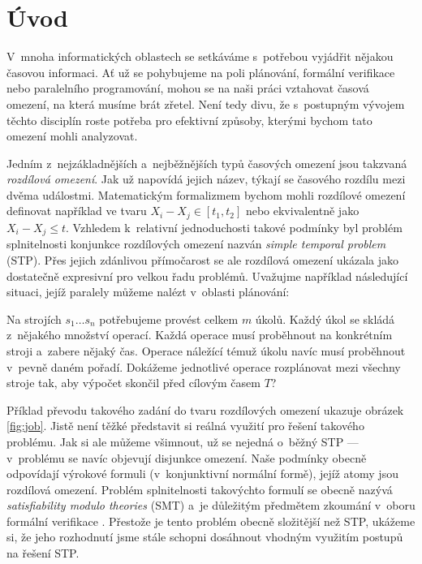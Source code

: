 \chapter*{Úvod}

V~mnoha informatických oblastech se setkáváme s~potřebou vyjádřit nějakou časovou informaci. Ať už se pohybujeme na poli plánování, formální verifikace nebo paralelního programování, mohou se na naši práci vztahovat časová omezení, na která musíme brát zřetel. Není tedy divu, že s~postupným vývojem těchto disciplín roste potřeba pro efektivní způsoby, kterými bychom tato omezení mohli analyzovat.

Jedním z~nejzákladnějších a~nejběžnějších typů časových omezení jsou takzvaná \emph{rozdílová omezení}. Jak už napovídá jejich název, týkají se časového rozdílu mezi dvěma událostmi. Matematickým formalizmem bychom mohli rozdílové omezení definovat například ve tvaru $X_i - X_j \in [t_1, t_2]$ nebo ekvivalentně jako $X_i - X_j \leq t$. Vzhledem k~relativní jednoduchosti takové podmínky byl problém splnitelnosti konjunkce rozdílových omezení nazván \emph{simple temporal problem} (STP). Přes jejich zdánlivou přímočarost se ale rozdílová omezení ukázala jako dostatečně expresivní pro velkou řadu problémů. Uvažujme například následující situaci, jejíž paralely můžeme nalézt v~oblasti plánování: 

\begin{center}
\begin{minipage}{\textwidth}
Na strojích $s_1 \dots s_n$ potřebujeme provést celkem $m$ úkolů. Každý úkol se skládá z~nějakého množství operací. Každá operace musí proběhnout na konkrétním stroji a~zabere nějaký čas. Operace náležící témuž úkolu navíc musí proběhnout v~pevně daném pořadí. Dokážeme jednotlivé operace rozplánovat mezi všechny stroje tak, aby výpočet skončil před cílovým časem $T$?
\end{minipage}
\end{center}

Příklad převodu takového zadání do tvaru rozdílových omezení ukazuje obrázek \ref{fig:job}. Jistě není těžké představit si reálná využití pro řešení takového problému. Jak si ale můžeme všimnout, už se nejedná o~běžný STP --- v~problému se navíc objevují disjunkce omezení. Naše podmínky obecně odpovídají výrokové formuli (v~konjunktivní normální formě), jejíž atomy jsou rozdílová omezení. Problém splnitelnosti takovýchto formulí se obecně nazývá \emph{satisfiability modulo theories} (SMT) a~je důležitým předmětem zkoumání v~oboru formální verifikace \cite{SMT}. Přestože je tento problém obecně složitější než STP, ukážeme si, že jeho rozhodnutí jsme stále schopni dosáhnout vhodným využitím postupů na řešení STP.

